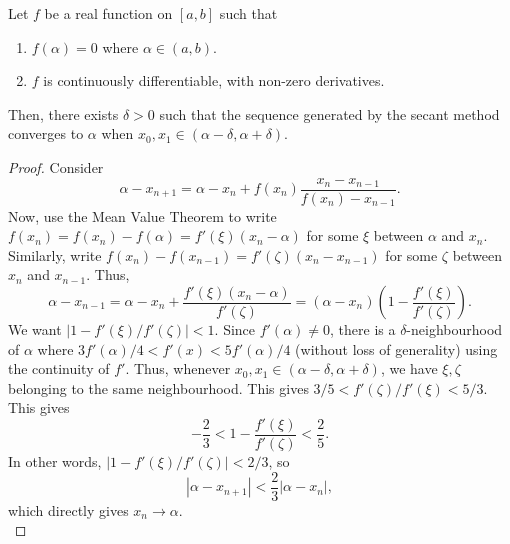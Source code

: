 \documentclass[11pt]{article}
\theoremstyle{definition}
\theoremstyle{remark}
\numberwithin{equation}{section}
\begin{document}
    \begin{theorem}
        Let $f$ be a real function on $[a, b]$ such that \begin{enumerate}
            \itemsep0em
            \item $f(\alpha) = 0$ where $\alpha \in (a, b)$.
            \item $f$ is continuously differentiable, with non-zero derivatives.
        \end{enumerate}
        Then, there exists $\delta > 0$ such that the sequence generated by the
        secant method converges to $\alpha$ when $x_0, x_1 \in (\alpha - \delta,
        \alpha + \delta)$.
    \end{theorem}
    \begin{proof}
        Consider \[
            \alpha - x_{n + 1} = \alpha - x_n + f(x_n)\frac{x_{n} - x_{n - 1}}{f(x_n)
            - x_{n - 1}}.
        \] Now, use the Mean Value Theorem to write $f(x_n) = f(x_n) - f(\alpha) =
        f'(\xi)(x_n - \alpha)$ for some $\xi$ between $\alpha$ and $x_n$. Similarly,
        write $f(x_n) - f(x_{n - 1}) = f'(\zeta)(x_n - x_{n - 1})$ for some $\zeta$
        between $x_n$ and $x_{n - 1}$. Thus, \[
            \alpha - x_{n - 1} = \alpha - x_n + \frac{f'(\xi)(x_n -
            \alpha)}{f'(\zeta)} = (\alpha - x_n)\left(1 -
            \frac{f'(\xi)}{f'(\zeta)}\right).
        \] We want $|1 - f'(\xi) / f'(\zeta)| < 1$. Since $f'(\alpha) \neq 0$, there
        is a $\delta$-neighbourhood of $\alpha$ where $3f'(\alpha) / 4 < f'(x) <
        5f'(\alpha) / 4$ (without loss of generality) using the continuity of $f'$.
        Thus, whenever $x_0, x_1 \in (\alpha - \delta, \alpha + \delta)$, we have
        $\xi, \zeta$ belonging to the same neighbourhood. This gives $3 / 5 <
        f'(\zeta) / f'(\xi) < 5 / 3$. This gives \[
            -\frac{2}{3} < 1 - \frac{f'(\xi)}{f'(\zeta)} < \frac{2}{5}.
        \] In other words, $|1 - f'(\xi) / f'(\zeta)| < 2 / 3$, so \[
            |\alpha - x_{n + 1}| < \frac{2}{3}|\alpha - x_n|,
        \] which directly gives $x_{n} \to \alpha$. \\


\end{proof}
\end{document}
